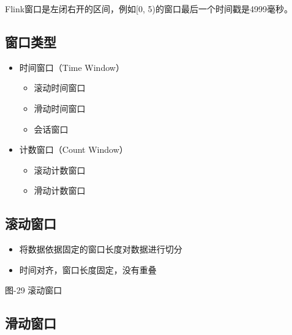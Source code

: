 \begin{Shaded}
\begin{Highlighting}[]
 \OperatorTok{*}     
\end{Highlighting}
\end{Shaded}

Flink窗口是{左闭右开}的区间，例如{[}0,
5)的窗口最后一个时间戳是4999毫秒。

\hypertarget{ux7a97ux53e3ux7c7bux578b}{%
\subsection{窗口类型}\label{ux7a97ux53e3ux7c7bux578b}}

\begin{itemize}
\tightlist
\item
  时间窗口（Time Window）

  \begin{itemize}
  \tightlist
  \item
    滚动时间窗口
  \item
    滑动时间窗口
  \item
    会话窗口
  \end{itemize}
\item
  计数窗口（Count Window）

  \begin{itemize}
  \tightlist
  \item
    滚动计数窗口
  \item
    滑动计数窗口
  \end{itemize}
\end{itemize}

\hypertarget{ux6edaux52a8ux7a97ux53e3}{%
\subsection{滚动窗口}\label{ux6edaux52a8ux7a97ux53e3}}

\begin{itemize}
\tightlist
\item
  将数据依据固定的窗口长度对数据进行切分
\item
  时间对齐，窗口长度固定，没有重叠
\end{itemize}

图-29 滚动窗口

\hypertarget{ux6ed1ux52a8ux7a97ux53e3}{%
\subsection{滑动窗口}\label{ux6ed1ux52a8ux7a97ux53e3}}

